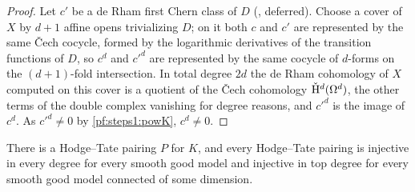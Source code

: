 \begin{proof}
Let $c'$ be a de Rham first Chern class of $D$ (,
deferred). Choose a cover of $X$ by $d+1$ affine opens trivializing $D$; on it both $c$ and $c'$ are represented by the
same \v{C}ech cocycle, formed by the logarithmic derivatives of the transition functions of $D$, so $c^d$ and $c'^d$ are
represented by the same cocycle of $d$-forms on the $(d+1)$-fold intersection. In total degree $2d$ the de Rham cohomology
of $X$ computed on this cover is a quotient of the \v{C}ech cohomology $\check{\mathrm{H}}^d(\Omega^d)$, the other terms of the
double complex vanishing for degree reasons, and $c'^d$ is the image of $c^d$. As $c'^d\ne0$ by \cref{pf:steps1:powK}, $c^d\ne0$.
\end{proof}

\begin{theorem}\label{pf:steps1:htinj}
There is a Hodge--Tate pairing $P$ for $K$, and every Hodge--Tate pairing is injective in every degree for every smooth good
model and injective in top degree for every smooth good model connected of some dimension.
\end{theorem}

